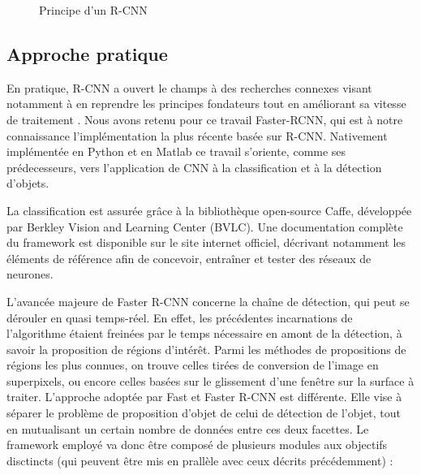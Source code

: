       \begin{figure}[H]
	  \centering
	  \caption{ Principe d'un \gls{R-CNN} }
	  \label{fig:c2p1s1_rcnn}
      \end{figure}
     
      
    \subsection{Approche pratique}
    
      En pratique, R-CNN a ouvert le champs à des recherches connexes visant notamment à en reprendre les principes fondateurs tout en améliorant sa vitesse de traitement \cite{Bib_FastRCNN}. 
      Nous avons retenu pour ce travail Faster-RCNN\cite{Bib_FasterRCNN}, qui est à notre connaissance l'implémentation la plus récente basée sur R-CNN. 
      Nativement implémentée en Python et en Matlab ce travail s'oriente, comme ses prédecesseurs, vers l'application de CNN à la classification et à la détection d'objets.  
      
      La classification est assurée grâce à la bibliothèque open-source Caffe, développée
      par Berkley Vision and Learning Center (BVLC)\cite{Bib_CaffeHome}. Une documentation complète du framework est disponible sur le site internet 
      officiel\cite{Bib_CaffeTuto}, décrivant notamment les éléments de référence afin de concevoir, entraîner et tester des réseaux de neurones. 
      
      L'avancée majeure de Faster R-CNN concerne la chaîne de détection, qui peut se dérouler en quasi temps-réel. 
      En effet, les précédentes incarnations de l'algorithme étaient freinées par le temps nécessaire en amont de la détection, à savoir la proposition de régions d'intérêt. 
      Parmi les méthodes de propositions de régions les plus connues, on trouve celles tirées de conversion de l'image en superpixels, ou encore celles basées sur le glissement d'une fenêtre sur la surface à traiter. 
      L'approche adoptée par Fast et Faster R-CNN est différente. 
      Elle vise à séparer le problème de proposition d'objet de celui de détection de l'objet, tout en mutualisant un certain nombre de données entre ces deux facettes. 
      Le framework employé va donc être composé de plusieurs modules aux objectifs disctincts (qui peuvent être mis en prallèle avec ceux décrits précédemment) : 
      
